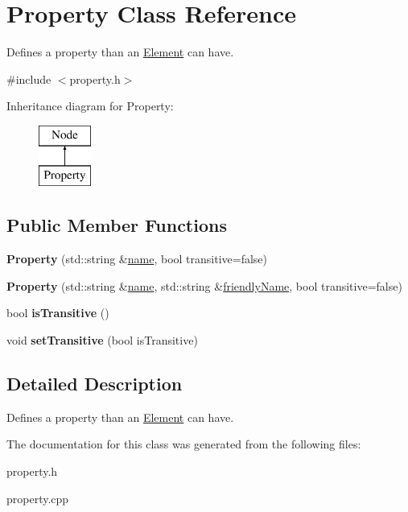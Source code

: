 \hypertarget{class_property}{\section{\-Property \-Class \-Reference}
\label{class_property}
}


\-Defines a property than an \hyperlink{class_element}{\-Element} can have.  




{\ttfamily \#include $<$property.\-h$>$}

\-Inheritance diagram for \-Property\-:\begin{figure}[H]
\begin{center}
\leavevmode
\includegraphics[height=2.000000cm]{class_property}
\end{center}
\end{figure}
\subsection*{\-Public \-Member \-Functions}
\begin{DoxyCompactItemize}
\item 
\hypertarget{class_property_a506507afa400d059e2dd4790d344d6ea}{{\bfseries \-Property} (std\-::string \&\hyperlink{class_node_aa829edc37a2c92dacdab95bcef248175}{name}, bool transitive=false)}\label{class_property_a506507afa400d059e2dd4790d344d6ea}

\item 
\hypertarget{class_property_a68ee42a4884e83965c129dd17f88243a}{{\bfseries \-Property} (std\-::string \&\hyperlink{class_node_aa829edc37a2c92dacdab95bcef248175}{name}, std\-::string \&\hyperlink{class_node_a157acddebd6860eccdc8495039db161f}{friendly\-Name}, bool transitive=false)}\label{class_property_a68ee42a4884e83965c129dd17f88243a}

\item 
\hypertarget{class_property_a2858f3e8c8b1438c70753ba8bba456c7}{bool {\bfseries is\-Transitive} ()}\label{class_property_a2858f3e8c8b1438c70753ba8bba456c7}

\item 
\hypertarget{class_property_ae1f8cc6697cec96b87b3f9bbf4064dd0}{void {\bfseries set\-Transitive} (bool is\-Transitive)}\label{class_property_ae1f8cc6697cec96b87b3f9bbf4064dd0}

\end{DoxyCompactItemize}


\subsection{\-Detailed \-Description}
\-Defines a property than an \hyperlink{class_element}{\-Element} can have. 

\-The documentation for this class was generated from the following files\-:\begin{DoxyCompactItemize}
\item 
property.\-h\item 
property.\-cpp\end{DoxyCompactItemize}
